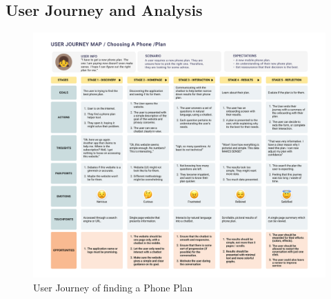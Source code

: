 \documentclass[conference]{IEEEtran}
\begin{document}
\subsection{User Journey and Analysis}
\begin{figure}[H]
    \centering
    \includegraphics[width=1\linewidth]{User Journey Map_357research.jpg}
    \caption{User Journey of finding a Phone Plan}
    \label{fig:user journey}
\end{figure}
\end{document}
